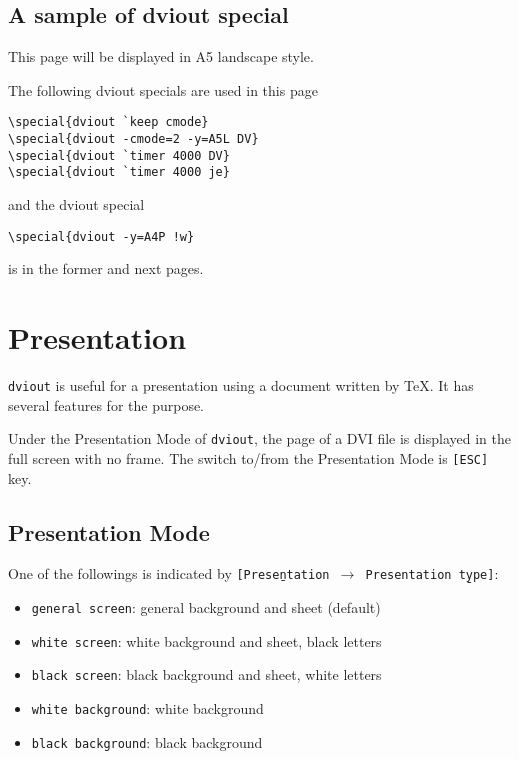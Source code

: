 \documentclass{article}
\begin{document}
\subsection{A sample of dviout special}
{\Large
\centerline{This page will be displayed in A5 landscape style.}

The following dviout specials are used in this page
\begin{verbatim}
\special{dviout `keep cmode}
\special{dviout -cmode=2 -y=A5L DV}
\special{dviout `timer 4000 DV}
\special{dviout `timer 4000 je}
\end{verbatim}
and the dviout special
\begin{verbatim}
\special{dviout -y=A4P !w}
\end{verbatim}
is in the former and next pages.
}
\newpage
%
%

\section{Presentation}
{\tt dviout} is useful for a presentation using a document written by 
\TeX.
It has several features for the purpose.  

Under the Presentation Mode of 
{\tt dviout}, the page of a DVI file is displayed in the full screen with 
no frame.
The switch to/from the Presentation Mode is {\tt[ESC]} key.

\subsection{Presentation Mode}
One of the followings is indicated by 
{\tt[Prese\b{n}tation $\to$ Presentation t\b{y}pe]}:

\begin{itemize}
\item
{\tt general screen}: general background and sheet (default)
\item
{\tt white screen}: white background and sheet, black letters
\item
{\tt black screen}: black background and sheet, white letters
\item
{\tt white background}: white background
\item
{\tt black background}: black background
\end{itemize}
\end{document}
